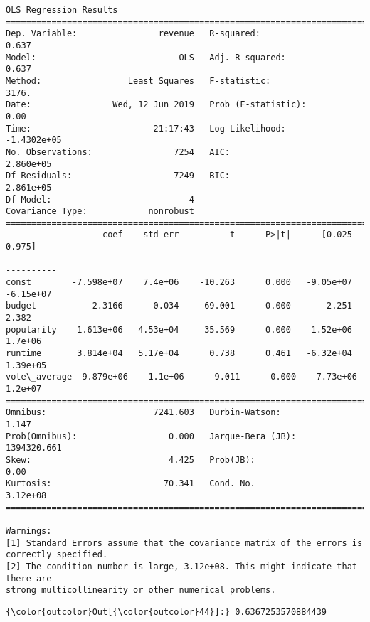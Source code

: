 \documentclass[11pt]{article}
\begin{document}
    \begin{Verbatim}[commandchars=\\\{\}]
                            OLS Regression Results                            
==============================================================================
Dep. Variable:                revenue   R-squared:                       0.637
Model:                            OLS   Adj. R-squared:                  0.637
Method:                 Least Squares   F-statistic:                     3176.
Date:                Wed, 12 Jun 2019   Prob (F-statistic):               0.00
Time:                        21:17:43   Log-Likelihood:            -1.4302e+05
No. Observations:                7254   AIC:                         2.860e+05
Df Residuals:                    7249   BIC:                         2.861e+05
Df Model:                           4                                         
Covariance Type:            nonrobust                                         
================================================================================
                   coef    std err          t      P>|t|      [0.025      0.975]
--------------------------------------------------------------------------------
const        -7.598e+07    7.4e+06    -10.263      0.000   -9.05e+07   -6.15e+07
budget           2.3166      0.034     69.001      0.000       2.251       2.382
popularity    1.613e+06   4.53e+04     35.569      0.000    1.52e+06     1.7e+06
runtime       3.814e+04   5.17e+04      0.738      0.461   -6.32e+04    1.39e+05
vote\_average  9.879e+06    1.1e+06      9.011      0.000    7.73e+06     1.2e+07
==============================================================================
Omnibus:                     7241.603   Durbin-Watson:                   1.147
Prob(Omnibus):                  0.000   Jarque-Bera (JB):          1394320.661
Skew:                           4.425   Prob(JB):                         0.00
Kurtosis:                      70.341   Cond. No.                     3.12e+08
==============================================================================

Warnings:
[1] Standard Errors assume that the covariance matrix of the errors is correctly specified.
[2] The condition number is large, 3.12e+08. This might indicate that there are
strong multicollinearity or other numerical problems.

    \end{Verbatim}

\begin{Verbatim}[commandchars=\\\{\}]
{\color{outcolor}Out[{\color{outcolor}44}]:} 0.6367253570884439
\end{Verbatim}
            
\end{document}
